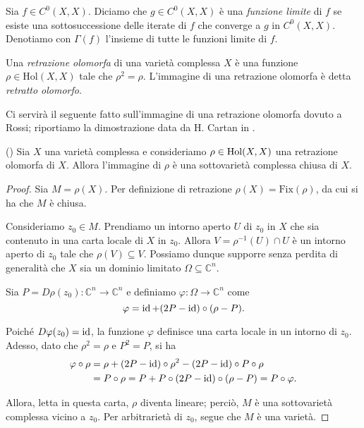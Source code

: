 \begin{defn}
    Sia $f\in C^0(X,X)$. Diciamo che $g\in C^0(X,X)$ è una \textit{funzione limite} di $f$ se esiste una sottosuccessione delle iterate di $f$ che converge a $g$ in $C^0(X,X)$. Denotiamo con $\Gamma(f)$ l'insieme di tutte le funzioni limite di $f$.
\end{defn}

\begin{defn}
    Una \textit{retrazione olomorfa} di una varietà complessa $X$ è una funzione $\rho\in\text{Hol}(X,X)$ tale che $\rho^2=\rho$. L'immagine di una retrazione olomorfa è detta \textit{retratto olomorfo}.
\end{defn}

Ci servirà il seguente fatto sull'immagine di una retrazione olomorfa dovuto a Rossi; riportiamo la dimostrazione data da H. Cartan in \cite{Ca}.

\begin{lm}
    (\cite[Section 5]{Rossi}) Sia $X$ una varietà complessa e consideriamo $\rho\in\textnormal{Hol}(X,X)$ una retrazione olomorfa di $X$. Allora l'immagine di $\rho$ è una sottovarietà complessa chiusa di $X$.
\end{lm}
\begin{proof}
    Sia $M=\rho(X)$. Per definizione di retrazione $\rho(X)=\text{Fix}(\rho)$, da cui si ha che $M$ è chiusa.
    
    Consideriamo $z_0 \in M$. Prendiamo un intorno aperto $U$ di $z_0$ in $X$ che sia contenuto in una carta locale di $X$ in $z_0$. Allora $V=\rho^{-1}(U)\cap U$ è un intorno aperto di $z_0$ tale che $\rho(V) \subseteq V$. Possiamo dunque supporre senza perdita di generalità che $X$ sia un dominio limitato $\Omega\subseteq\mathbb{C}^n$.

    Sia $P=D\rho(z_0):\mathbb{C}^n \longrightarrow \mathbb{C}^n$ e definiamo $\varphi:\Omega \longrightarrow \mathbb{C}^n$ come
    $$\varphi=\operatorname{id}+(2P-\operatorname{id})\circ(\rho-P).$$

    Poiché $D\varphi(z_0)=\operatorname{id}$, la funzione $\varphi$ definisce una carta locale in un intorno di $z_0$. Adesso, dato che $\rho^2=\rho$ e $P^2=P$, si ha
    \begin{align*}
        \varphi\circ\rho&=\rho+(2P-\operatorname{id})\circ\rho^2-(2P-\operatorname{id})\circ P\circ\rho\\
        &=P\circ\rho=P+P\circ(2P-\operatorname{id})\circ(\rho-P)=P\circ\varphi.
    \end{align*}

    Allora, letta in questa carta, $\rho$ diventa lineare; perciò, $M$ è una sottovarietà complessa vicino a $z_0$. Per arbitrarietà di $z_0$, segue che $M$ è una varietà.
\end{proof}

